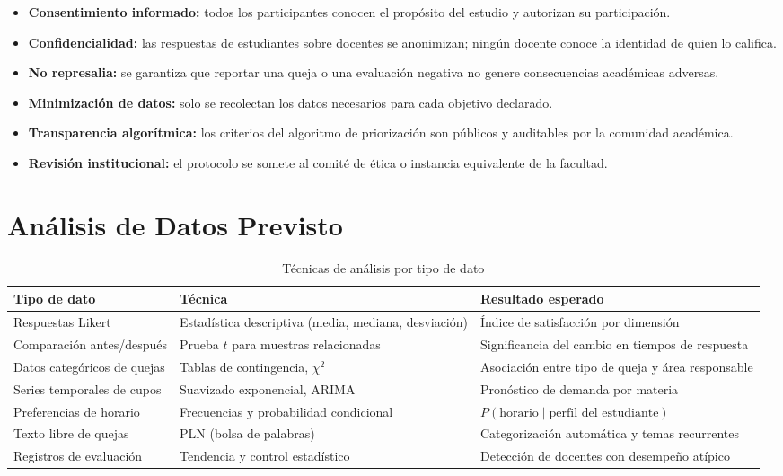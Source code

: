 \begin{cajaNota}
\begin{itemize}[leftmargin=1.2cm, itemsep=3pt]
  \item \textbf{Consentimiento informado:} todos los participantes conocen el
        propósito del estudio y autorizan su participación.
  \item \textbf{Confidencialidad:} las respuestas de estudiantes sobre docentes
        se anonimizan; ningún docente conoce la identidad de quien lo califica.
  \item \textbf{No represalia:} se garantiza que reportar una queja o una
        evaluación negativa no genere consecuencias académicas adversas.
  \item \textbf{Minimización de datos:} solo se recolectan los datos necesarios
        para cada objetivo declarado.
  \item \textbf{Transparencia algorítmica:} los criterios del algoritmo de
        priorización son públicos y auditables por la comunidad académica.
  \item \textbf{Revisión institucional:} el protocolo se somete al comité de
        ética o instancia equivalente de la facultad.
\end{itemize}
\end{cajaNota}

\section{Análisis de Datos Previsto}

\begin{table}[H]
\centering
\caption{Técnicas de análisis por tipo de dato}
\label{tab:analisis}
\small
\begin{tabularx}{\textwidth}{@{}p{3.4cm} p{5.4cm} X@{}}
\toprule
\rowcolor{azulClaro}
\textbf{Tipo de dato} & \textbf{Técnica} & \textbf{Resultado esperado} \\
\midrule
Respuestas Likert & Estadística descriptiva (media, mediana, desviación) &
    Índice de satisfacción por dimensión \\
Comparación antes/después & Prueba $t$ para muestras relacionadas &
    Significancia del cambio en tiempos de respuesta \\
Datos categóricos de quejas & Tablas de contingencia, $\chi^{2}$ &
    Asociación entre tipo de queja y área responsable \\
Series temporales de cupos & Suavizado exponencial, ARIMA &
    Pronóstico de demanda por materia \\
Preferencias de horario & Frecuencias y probabilidad condicional &
    $P(\text{horario} \mid \text{perfil del estudiante})$ \\
Texto libre de quejas & PLN (bolsa de palabras) &
    Categorización automática y temas recurrentes \\
Registros de evaluación & Tendencia y control estadístico &
    Detección de docentes con desempeño atípico \\
\bottomrule
\end{tabularx}
\end{table}

